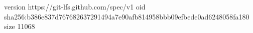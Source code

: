 version https://git-lfs.github.com/spec/v1
oid sha256:b386e837d767682637291494a7e90afb814958bbb09efbede0ad6248058fa180
size 11068
